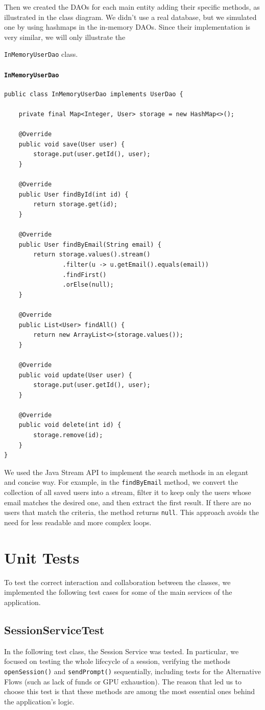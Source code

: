 \documentclass[a4paper,11pt]{report}
\begin{document}
    Then we created the DAOs for each main entity adding their specific methods, as illustrated in the class diagram.
    We didn't use a real database, but we simulated one by using hashmaps in the in-memory DAOs. Since their implementation is very similar, we will only illustrate the 
    
    \clearpage
    \texttt{InMemoryUserDao} class.
    \subsubsection{\texttt{InMemoryUserDao}}
    \begin{lstlisting}[label={lst:inmemoryuserdao}]
public class InMemoryUserDao implements UserDao {

	private final Map<Integer, User> storage = new HashMap<>();

	@Override
	public void save(User user) {
		storage.put(user.getId(), user);
	}

	@Override
	public User findById(int id) {
		return storage.get(id);
	}

	@Override
	public User findByEmail(String email) {
		return storage.values().stream()
				.filter(u -> u.getEmail().equals(email))
				.findFirst()
				.orElse(null);
	}

	@Override
	public List<User> findAll() {
		return new ArrayList<>(storage.values());
	}

	@Override
	public void update(User user) {
		storage.put(user.getId(), user);
	}

	@Override
	public void delete(int id) {
		storage.remove(id);
	}
}
    \end{lstlisting}
    We used the Java Stream API to implement the search methods in an elegant and concise way. For example, in the \texttt{findByEmail} method, we convert the collection of all saved users into a stream, filter it to keep only the users whose email matches the desired one, and then extract the first result. If there are no users that match the criteria, the method returns \texttt{null}. This approach avoids the need for less readable and more complex loops.

\chapter{Unit Tests}
To test the correct interaction and collaboration between the classes, we implemented the following test cases for some of the main services of the application.

\section{SessionServiceTest}
In the following test class, the Session Service was tested. In particular, we focused on testing the whole lifecycle of a session, verifying the methods \texttt{openSession()} and \texttt{sendPrompt()} sequentially, including tests for the Alternative Flows (such as lack of funds or GPU exhaustion). The reason that led us to choose this test is that these methods are among the most essential ones behind the application's logic.
\end{document}
